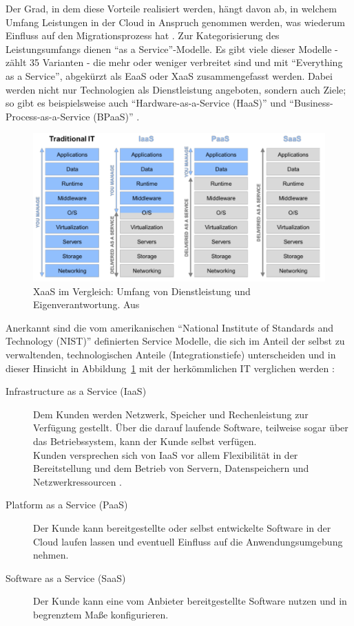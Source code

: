 Der Grad, in dem diese Vorteile realisiert werden, hängt davon ab, 
in welchem Umfang Leistungen in der Cloud in Anspruch genommen werden, was 
wiederum Einfluss auf den Migrationsprozess hat . Zur 
Kategorisierung des Leistungsumfangs dienen "`as a Service"'-Modelle. Es
gibt viele dieser Modelle -  zählt 35
Varianten - die mehr oder weniger verbreitet sind und mit "`Everything as a
Service"', abgekürzt als EaaS oder XaaS zusammengefasst werden. Dabei werden
nicht nur Technologien als Dienstleistung angeboten, sondern auch Ziele; so gibt
es beispielsweise auch "`Hardware-as-a-Service (HaaS)"' und
"`Business-Process-as-a-Service (BPaaS)"'
.
\begin{figure}%
\begin{center}
\includegraphics[width=\textwidth]{images/XaaS_im_Vergleich.png}
\caption{XaaS im Vergleich: Umfang von
Dienstleistung und Eigenverantwortung. Aus
\protect{} }
\label{fig:xaas_im_vergleich}
\end{center}
\end{figure}

Anerkannt sind die vom amerikanischen "`National Institute of Standards and Technology (NIST)"' definierten Service Modelle, die sich im Anteil der selbst zu verwaltenden, technologischen Anteile (Integrationstiefe)
unterscheiden und in dieser Hinsicht in Abbildung~\ref{fig:xaas_im_vergleich}
mit der herkömmlichen IT verglichen werden :
\begin{description}
	\item[Infrastructure as a Service (IaaS)] Dem Kunden werden Netzwerk,
Speicher und Rechenleistung zur Verfügung gestellt. Über die darauf laufende
Software, teilweise sogar über das Betriebssystem, kann der Kunde selbst verfügen. \\
Kunden versprechen sich von IaaS vor allem Flexibilität in der Bereitstellung
und dem Betrieb von Servern, Datenspeichern und Netzwerkressourcen .
	\item[Platform as a Service (PaaS)] Der Kunde kann bereitgestellte
oder selbst entwickelte Software in der Cloud laufen lassen und eventuell
Einfluss auf die Anwendungsumgebung nehmen. 
	\item[Software as a Service (SaaS)] Der Kunde kann eine vom Anbieter
bereitgestellte Software nutzen und in begrenztem Maße konfigurieren.
\end{description}

